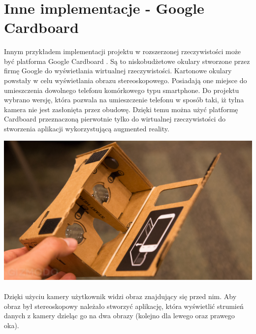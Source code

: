 \newpage
\section{Inne implementacje - Google Cardboard}
\paragraph{}
Innym przykładem implementacji projektu w rozszerzonej rzeczywistości może być platforma Google Cardboard \cite{cardboard}. Są to niskobudżetowe okulary stworzone przez firmę Google do wyświetlania wirtualnej rzeczywistości. Kartonowe okulary powstały w celu wyświetlania obrazu stereoskopowego. Posiadają one miejsce do umieszczenia dowolnego telefonu komórkowego typu smartphone. Do projektu wybrano wersję, która pozwala na umieszczenie telefonu w sposób taki, iż tylna kamera nie jest zasłonięta przez obudowę. Dzięki temu można użyć platformę Cardboard przeznaczoną pierwotnie tylko do wirtualnej rzeczywistości do stworzenia aplikacji wykorzystującą augmented reality.

\begin{center}
\includegraphics[width=1\textwidth]{images/cardboard.jpg}
\end{center}

\paragraph{}
Dzięki użyciu kamery użytkownik widzi obraz znajdujący się przed nim. Aby obraz był stereoskopowy należało stworzyć aplikację, która wyświetlić strumień danych z kamery dzieląc go na dwa obrazy (kolejno dla lewego oraz prawego oka).

